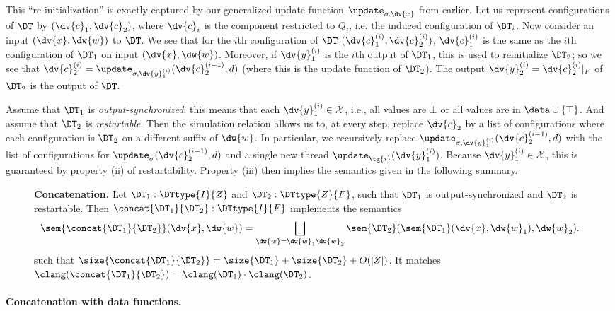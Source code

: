 This ``re-initialization'' is exactly captured by our generalized update function $\update_{\sigma, \dv{x}}$ from earlier. Let us represent configurations of $\DT$ by $(\dv{c}_1, \dv{c}_2)$, where $\dv{c}_i$ is the component restricted to $Q_i$, i.e. the induced configuration of $\DT_i$.
Now consider an input $(\dv{x},\dw{w})$ to $\DT$.
We see that for the $i$th configuration of $\DT$ $(\dv{c}_1^{(i)},\dv{c}_2^{(i)})$, $\dv{c}_1^{(i)}$ is the same as the $i$th configuration of $\DT_1$ on input $(\dv{x},\dw{w})$.
Moreover, if $\dv{y}_1^{(i)}$ is the $i$th output of $\DT_1$, this is used to reinitialize $\DT_2$;
so we see that $\dv{c}_2^{(i)} = \update_{\sigma,\dv{y}_1^{(i)}}(\dv{c}_2^{(i-1)},d)$ (where this is the update function of $\DT_2$). The output $\dv{y}_2^{(i)} = \dv{c}_2^{(i)}|_F$ of $\DT_2$ is the output of $\DT$.

Assume that $\DT_1$ is \emph{output-synchronized}: this means that each $\dv{y}_1^{(i)} \in \mathcal{X}$, i.e., all values are $\bot$ or all values are in $\data \cup \{\top\}$. And assume that $\DT_2$ is \emph{restartable}. Then the simulation relation allows us to, at every step, replace $\dv{c}_2$ by a list of configurations where each configuration is $\DT_2$ on a different suffix of $\dw{w}$. In particular, we recursively replace $\update_{\sigma, \dv{y}_1^{(i)}}(\dv{c}_2^{(i-1)},d)$ with the list of configurations for $\update_\sigma(\dv{c}_2^{(i-1)},d)$ and a single new thread $\update_{\tg{i}}(\dv{y}_1^{(i)})$. Because $\dv{y}_1^{(i)} \in \mathcal{X}$, this is guaranteed by property (ii) of restartability. Property (iii) then implies the semantics given in the following summary.

\begin{figure}[H]
\begin{dtbox}
\textbf{Concatenation.}
Let $\DT_1: \DTtype{I}{Z}$ and $\DT_2: \DTtype{Z}{F}$,
such that $\DT_1$ is output-synchronized and $\DT_2$ is restartable.
Then $\concat{\DT_1}{\DT_2} : \DTtype{I}{F}$ implements the semantics
\[
\sem{\concat{\DT_1}{\DT_2}}(\dv{x},\dw{w}) = \bigsqcup_{\dw{w} = \dw{w}_1 \dw{w}_2} \sem{\DT_2}(\sem{\DT_1}(\dv{x},\dw{w}_1),\dw{w}_2).
\]
such that $\size{\concat{\DT_1}{\DT_2}} = \size{\DT_1} + \size{\DT_2} + O(|Z|)$.
It matches $\clang(\concat{\DT_1}{\DT_2}) = \clang(\DT_1) \cdot \clang(\DT_2)$.
\end{dtbox}

\label{dt:fig:concatenation}
\end{figure}

\paragraph*{Concatenation with data functions.}

